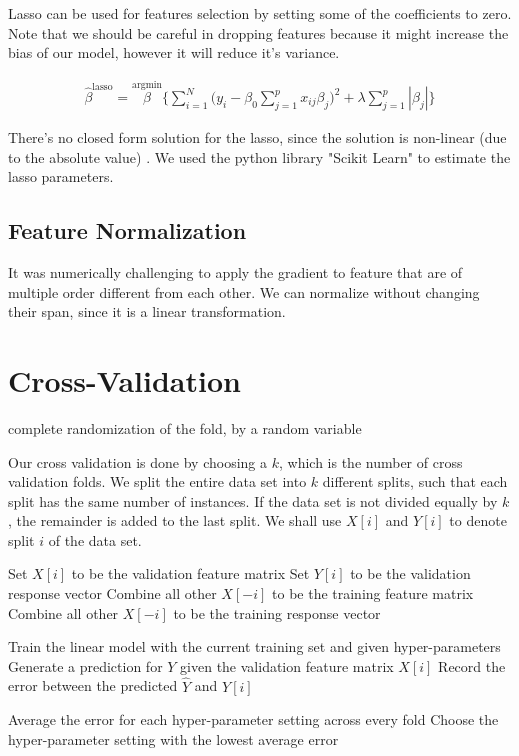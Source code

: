 \documentclass[conference]{IEEEtran}\usepackage[]{graphicx}\usepackage[]{color}
\begin{document}
Lasso can be used for features selection by setting some of the coefficients to
zero. Note that we should be careful in dropping features because it might
increase the bias of our model, however it will reduce it's variance.

\begin{eqnarray}
  \hat{\beta}^{\text{lasso}} = \stackrel{\text{argmin}}{\beta}
  \Bigg\{ \sum_{i=1}^N \bigg(y_i - \beta_0 \sum_{j=1}^p x_{ij} \beta_j \bigg)^2 +
  \lambda \sum_{j=1}^p | \beta_j | \Bigg\}
\end{eqnarray}

There's no closed form solution for the lasso, since the solution is non-linear
(due to the absolute value) \cite{hastie2005elements}. We used the python
library "Scikit Learn" \cite{scikit-learn} to estimate the lasso parameters.

\subsection{Feature Normalization}

It was numerically challenging to apply the gradient to feature that are of
multiple order different from each other. We can normalize without changing
their span, since it is a linear transformation.

\section{Cross-Validation}


complete randomization of the fold, by a random variable

Our cross validation is done by choosing a $k$, which is the number of cross
validation folds. We split the entire data set into $k$ different splits, such
that each split has the same number of instances. If the data set is not divided
equally by $k$, the remainder is added to the last split. We shall use $X[i]$ and
$Y[i]$ to denote split $i$ of the data set. 
\begin{algorithmic}
    \State Set $X[i]$ to be the validation feature matrix
    \State Set $Y[i]$ to be the validation response vector
    \State Combine all other $X[-i]$ to be the training feature matrix
    \State Combine all other $X[-i]$ to be the training response vector
    
        \State Train the linear model with the current training set and given hyper-parameters
        \State Generate a prediction for $Y$ given the validation feature matrix $X[i]$
        \State Record the error between the predicted $\hat{Y}$ and $Y[i]$
    \EndFor
    
\EndFor
\State Average the error for each hyper-parameter setting across every fold
\State Choose the hyper-parameter setting with the lowest average error
\end{algorithmic}
\end{document}
